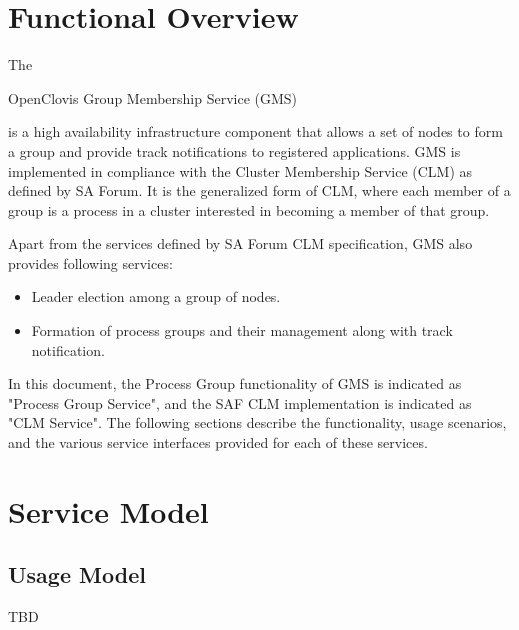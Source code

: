
\hypertarget{group__group22}{
\chapter{Functional Overview}
\label{group__group22}
}

\begin{flushleft}

The \begin{bf}OpenClovis Group Membership Service (GMS)\end{bf} is a
high availability infrastructure component that allows a set of
nodes to form a group and provide track notifications to registered
applications. GMS is implemented in compliance with the Cluster
Membership Service (CLM) as defined by SA Forum. It is the
generalized form of CLM, where each member of a group is a process
in a cluster interested in becoming a member of that group.
\par
Apart from the services defined by SA Forum CLM specification, GMS
also provides following services:
\begin{itemize}
\item Leader election among a group of nodes.
\item Formation of process groups and their management along with
track notification.
\end{itemize}
In this document, the Process Group functionality of GMS is
indicated as "Process Group Service", and the SAF CLM implementation
is indicated as "CLM Service". The following sections describe the
functionality, usage scenarios, and the various service
interfaces provided for each of these services.

\chapter{Service Model}
\section{Usage Model}
TBD

\end{flushleft}
